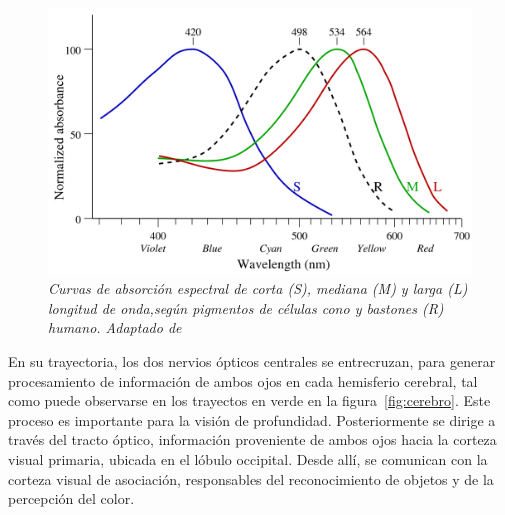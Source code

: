\begin{figure}[h]
  \centering
  \includegraphics[scale=.3]{images/cono}
  \caption{\em Curvas de absorción espectral de corta (S), mediana (M) y larga (L) longitud de onda,según pigmentos de células cono y bastones (R) humano. Adaptado de \cite{Bowmaker1980}}  
  \label{fig:cono}
\end{figure}

En su trayectoria, los dos nervios ópticos centrales se entrecruzan, para generar procesamiento de información de ambos ojos en cada hemisferio cerebral, tal como puede observarse en los trayectos en verde en la figura~\ref{fig:cerebro}. Este proceso es importante para la visión de profundidad. Posteriormente se dirige a través del tracto óptico, información proveniente de ambos ojos hacia la corteza visual primaria, ubicada en el lóbulo occipital. Desde allí, se comunican con la corteza visual de asociación, responsables del reconocimiento de objetos y de la percepción del color.


